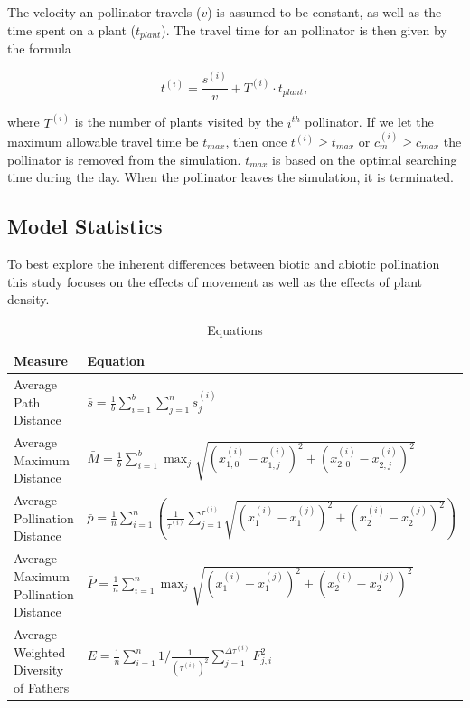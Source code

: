 The velocity an pollinator travels ($v$) is assumed to be constant, as well as the time spent on a
plant ($t_{plant}$).  The travel time for an pollinator is then given by the formula

\[
t^{\left(i\right)} = \frac{s^{\left(i\right)}}{v} + T^{\left(i\right)} \cdot t_{plant},
\]

where $T^{\left(i\right)}$ is the number of plants visited by the $i^{th}$ pollinator. If we let the
maximum allowable travel time be $t_{max}$, then once $t^{\left(i\right)} \geq t_{max}$ or
$c^{\left(i\right)}_m \geq c_{max}$ the pollinator is removed from the simulation. $t_{max}$ is based
on the optimal searching time during the day.  When the pollinator leaves the simulation, it is terminated.

\subsection{Model Statistics}

To best explore the inherent differences between biotic and abiotic pollination this study focuses
on the effects of movement as well as the effects of plant density.  

\begin{table}[h]
\setlength{\extrarowheight}{10pt}
{\footnotesize
\begin{tabular}{|l|l|}
  \hline
  Measure & Equation \\[8pt] \hline   \hline
  Average Path Distance & $\bar{s} = \frac{1}{b} \sum_{i=1}^b \sum_{j=1}^n s^{\left(i\right)}_j$ \\[8pt] \hline
  Average Maximum Distance & $ \bar{M} = \frac{1}{b} \sum_{i=1}^b \max_j \sqrt{\left(x^{\left(i\right)}_{1,0}
- x^{\left(i\right)}_{1,j}\right)^2 +
      \left(x^{\left(i\right)}_{2,0} -
x^{\left(i\right)}_{2,j}\right)^2}  $ \\[8pt] \hline
  Average Pollination Distance & $ \bar{p} = \frac{1}{n} \sum_{i=1}^{n} \left(
\frac{1}{\tau^{\left(i\right)}} \sum_{j=1}^{\tau^{\left(i\right)}}
\sqrt{\left(x^{\left(i\right)}_1 -
x^{\left(j\right)}_1\right)^2 + \left(x^{\left(i\right)}_2 -
    x^{\left(j\right)}_2\right)^2}
    \right)  $ \\[12pt]  \hline
  Average Maximum Pollination Distance & $ \bar{P} = \frac{1}{n} \sum_{i=1}^{n} \max_j \sqrt{\left(x^{\left(i\right)}_1 -
x^{\left(j\right)}_1\right)^2 + \left(x^{\left(i\right)}_2 -
    x^{\left(j\right)}_2\right)^2}$ \\[8pt]  \hline
  Average Weighted Diversity of Fathers & $ E = \frac{1}{n} \sum_{i=1}^n 1/\frac{1}{\left(\tau^{\left(i\right)}\right)^2}
  \sum_{j=1}^{\Delta\tau^{\left(i\right)}} F^2_{j,i} $ \\[8pt]
  \hline
\end{tabular}
}
\caption{Equations}
\label{tab:eqn}
\end{table}

